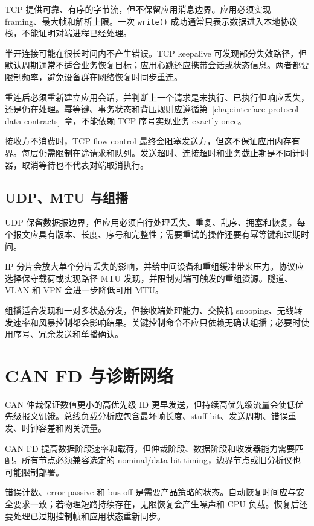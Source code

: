 TCP 提供可靠、有序的字节流，但不保留应用消息边界\cite{rfc9293}。应用必须实现 framing、最大帧和解析上限。一次 \texttt{write()} 成功通常只表示数据进入本地协议栈，不能证明对端进程已经处理。

半开连接可能在很长时间内不产生错误。TCP keepalive 可发现部分失效路径，但默认周期通常不适合业务恢复目标；应用心跳还应携带会话或状态信息。两者都要限制频率，避免设备群在网络恢复时同步重连。

重连后必须重新建立应用会话，并判断上一个请求是未执行、已执行但响应丢失，还是仍在处理。幂等键、事务状态和背压规则应遵循\mbox{第~\ref{chap:interface-protocol-data-contracts}~章}，不能依赖 TCP 序号实现业务 exactly-once。

接收方不消费时，TCP flow control 最终会阻塞发送方，但这不保证应用内存有界。每层仍需限制在途请求和队列。发送超时、连接超时和业务截止期是不同计时器，取消等待也不代表对端取消执行。

\subsection{UDP、MTU 与组播}

UDP 保留数据报边界，但应用必须自行处理丢失、重复、乱序、拥塞和恢复\cite{rfc8085}。每个报文应具有版本、长度、序号和完整性；需要重试的操作还要有幂等键和过期时间。

IP 分片会放大单个分片丢失的影响，并给中间设备和重组缓冲带来压力。协议应选择保守载荷或实现路径 MTU 发现，并限制对端可触发的重组资源。隧道、VLAN 和 VPN 会进一步降低可用 MTU。

组播适合发现和一对多状态分发，但接收端处理能力、交换机 snooping、无线转发速率和风暴控制都会影响结果。关键控制命令不应只依赖无确认组播；必要时使用序号、冗余发送和单播确认。

\section{CAN FD 与诊断网络}

CAN 仲裁保证数值更小的高优先级 ID 更早发送，但持续高优先级流量会使低优先级报文饥饿。总线负载分析应包含最坏帧长度、stuff bit、发送周期、错误重发、时钟容差和网关流量。

CAN FD 提高数据阶段速率和载荷，但仲裁阶段、数据阶段和收发器能力需要匹配。所有节点必须兼容选定的 nominal/data bit timing，边界节点或旧分析仪也可能限制部署。

错误计数、error passive 和 bus-off 是需要产品策略的状态。自动恢复时间应与安全要求一致；若物理短路持续存在，无限恢复会产生噪声和 CPU 负载。恢复后还要处理已过期控制帧和应用状态重新同步。

